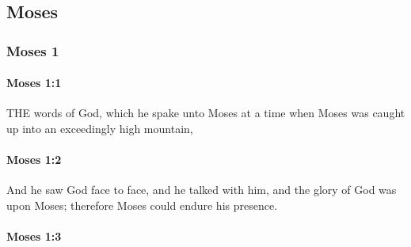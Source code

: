 \subsection{Moses}
	\label{MOSES}

	\subsubsection{Moses 1} %
		\label{MOSES-1}
		
		\paragraph{Moses 1:1} %
			\label{MOSES-1-1}

			THE words of God, which he spake unto Moses at a time when Moses was caught up into an exceedingly high mountain,
			
			
		\paragraph{Moses 1:2} %
			\label{MOSES-1-2}

			And he saw God face to face, and he talked with him, and the glory of God was upon Moses; therefore Moses could endure his presence.
			
			
		\paragraph{Moses 1:3} %
			\label{MOSES-1-3}

